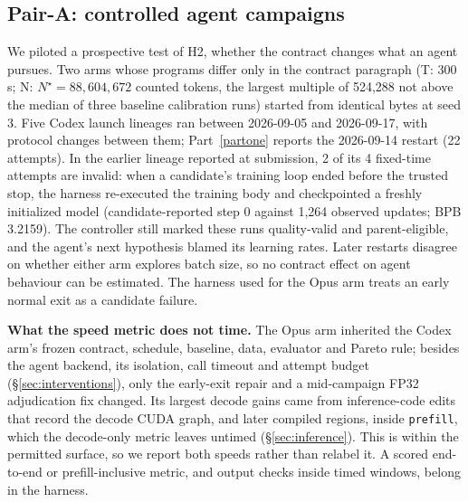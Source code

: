 \documentclass{article}
\newif\ifshowhumanmarkers \showhumanmarkersfalse
\newcommand{\humantag}[1]{{\color{humanframe}\sffamily\scriptsize\bfseries HUMAN AUTHOR MUST REWRITE/VERIFY [#1]}\ }
\newcommand{\humanauthor}[2][]{\ifshowhumanmarkers\begin{humanbox}\humantag{#1}#2\end{humanbox}\else #2\par\fi}
\begin{document}
\subsection{Pair-A: controlled agent campaigns}\label{sec:pilot}
\humanauthor[P2-15]{We piloted a prospective test of H2, whether the contract changes what an agent pursues. Two arms whose programs differ only in the contract paragraph (T: 300\,s; N: $N^\star=88{,}604{,}672$ counted tokens, the largest multiple of 524,288 not above the median of three baseline calibration runs) started from identical bytes at seed 3. Five Codex launch lineages ran between 2026-09-05 and 2026-09-17, with protocol changes between them; Part~\ref{partone} reports the 2026-09-14 restart (22 attempts). In the earlier lineage reported at submission, 2 of its 4 fixed-time attempts are invalid: when a candidate's training loop ended before the trusted stop, the harness re-executed the training body and checkpointed a freshly initialized model (candidate-reported step 0 against 1,264 observed updates; BPB 3.2159). The controller still marked these runs quality-valid and parent-eligible, and the agent's next hypothesis blamed its learning rates. Later restarts disagree on whether either arm explores batch size, so no contract effect on agent behaviour can be estimated. The harness used for the Opus arm treats an early normal exit as a candidate failure.}

\humanauthor[P2-16]{\textbf{What the speed metric does not time.} The Opus arm inherited the Codex arm's frozen contract, schedule, baseline, data, evaluator and Pareto rule; besides the agent backend, its isolation, call timeout and attempt budget (\S\ref{sec:interventions}), only the early-exit repair and a mid-campaign FP32 adjudication fix changed. Its largest decode gains came from inference-code edits that record the decode CUDA graph, and later compiled regions, inside \texttt{prefill}, which the decode-only metric leaves untimed (\S\ref{sec:inference}). This is within the permitted surface, so we report both speeds rather than relabel it. A scored end-to-end or prefill-inclusive metric, and output checks inside timed windows, belong in the harness.}
\label{parttwoend}

\clearpage
\end{document}
